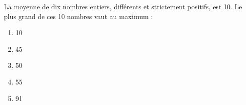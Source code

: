 La moyenne de dix nombres entiers, différents et strictement positifs, est 10. Le plus grand de ces 10 nombres vaut au maximum :
\begin{multicols}{5}
  \begin{enumerate}[A/]
    \item 10
    \item 45
    \item 50
    \item 55
    \item 91
  \end{enumerate}
\end{multicols}